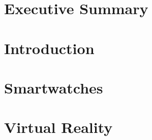 \documentclass[12pt, titlepage, onecolumn]{article}
\begin{document}
\begin{titlepage}

\end{titlepage}
\frontmatter
\section*{Executive Summary}

\clearpage
\begin{singlespace}
\tableofcontents
\clearpage
\end{singlespace}
\clearpage
\setlength{\parindent}{0em}
\setlength{\parskip}{1em}
\mainmatter

\section{Introduction}


\clearpage
\section{Smartwatches}

\clearpage
\section{Virtual Reality}

\clearpage
\backmatter
\begin{singlespace}
    



\clearpage
\end{singlespace}
\end{document}

